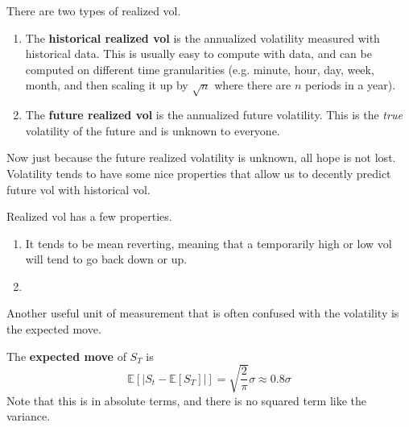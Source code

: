 \documentclass{article}
\begin{document}
    \begin{definition}
      There are two types of realized vol. 
      \begin{enumerate}
        \item The \textbf{historical realized vol} is the annualized volatility measured with historical data. This is usually easy to compute with data, and can be computed on different time granularities (e.g. minute, hour, day, week, month, and then scaling it up by $\sqrt{n}$ where there are $n$ periods in a year). 
        \item The \textbf{future realized vol} is the annualized future volatility. This is the \textit{true} volatility of the future and is unknown to everyone. 
      \end{enumerate}
    \end{definition}

    Now just because the future realized volatility is unknown, all hope is not lost. Volatility tends to have some nice properties that allow us to decently predict future vol with historical vol. 

    \begin{theorem}
      Realized vol has a few properties. 
      \begin{enumerate}
        \item It tends to be mean reverting, meaning that a temporarily high or low vol will tend to go back down or up. 
        \item 
      \end{enumerate}
    \end{theorem}

    Another useful unit of measurement that is often confused with the volatility is the expected move. 

    \begin{definition}
      The \textbf{expected move} of $S_T$ is 
      \begin{equation}
        \mathbb{E}[|S_t - \mathbb{E}[S_T]|] = \sqrt{\frac{2}{\pi}} \sigma \approx 0.8 \sigma
      \end{equation}
      Note that this is in absolute terms, and there is no squared term like the variance. 
    \end{definition}
\end{document}
